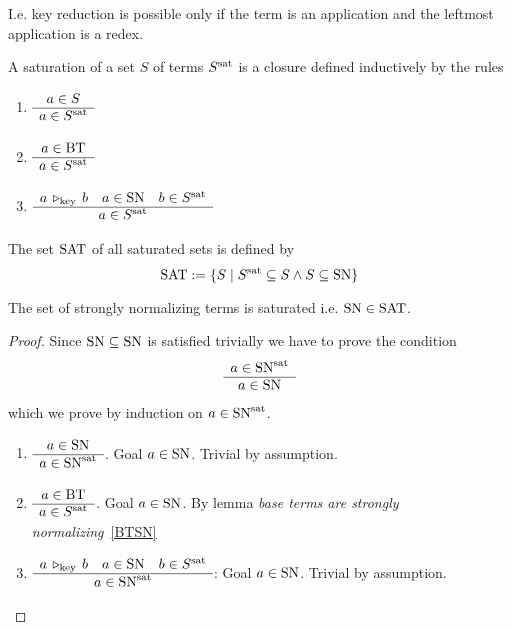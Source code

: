 I.e. key reduction is possible only if the term is an application and the
leftmost application is a redex.






\begin{definition} %
  A saturation of a set $S$ of terms $S^{\text{sat}}$ is a closure defined inductively
  by the rules
  \begin{enumerate}

  \item $\begin{array}{c} a \in S \\ \hline a \in S^{\text{sat}}\end{array}$

  \item $\begin{array}{c} a \in \text{BT} \\ \hline a \in S^{\text{sat}}\end{array}$

  \item $\begin{array}{c} a \,\triangleright_{\text{key}}\, b \quad a \in \text{SN} \quad b \in S^{\text{sat}} \\ \hline a \in S^{\text{sat}}\end{array}$
  \end{enumerate}
\end{definition}

\begin{definition}
  The set $\text{SAT}$ of all saturated sets is defined by
  $$
  \text{SAT} := \{S \mid  S^{\text{sat}} \subseteq S \land S \subseteq \text{SN} \}
  $$
\end{definition}


\begin{lemma}
  \label{SNinSAT}
  The set of strongly normalizing terms is saturated i.e. $\text{SN} \in \text{SAT}$.

  \begin{proof} Since $\text{SN} \subseteq \text{SN}$ is satisfied trivially we have to
    prove the condition
    $$
    \begin{array}{c} a \in \text{SN}^{\text{sat}} \\ \hline a \in \text{SN}\end{array}
    $$
    which we prove by induction on $a \in \text{SN}^{\text{sat}}$.

    \begin{enumerate}
    \item $\begin{array}{c} a \in \text{SN} \\ \hline a \in \text{SN}^{\text{sat}}\end{array}$. Goal $a \in \text{SN}$. Trivial by
      assumption.

    \item $\begin{array}{c} a \in \text{BT} \\ \hline a \in S^{\text{sat}}\end{array}$. Goal $a \in \text{SN}$. By lemma
      \emph{base terms are strongly normalizing}~\ref{BTSN}

    \item $\begin{array}{c} a \,\triangleright_{\text{key}}\, b \quad a \in \text{SN} \quad b \in S^{\text{sat}} \\ \hline a \in \text{SN}^{\text{sat}}\end{array}$: Goal $a \in \text{SN}$. Trivial by assumption.
    \end{enumerate}
  \end{proof}
\end{lemma}






